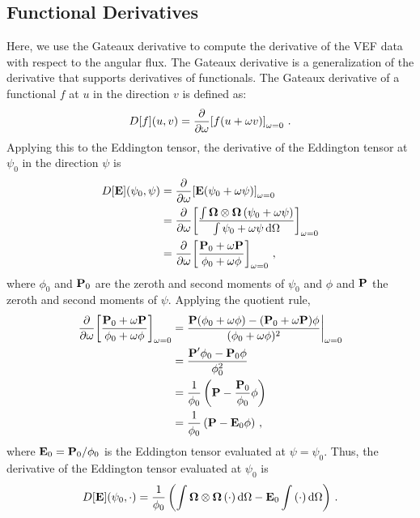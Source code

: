 \documentclass[../doc.tex]{subfiles}
\begin{document}
\subsection{Functional Derivatives}
Here, we use the Gateaux derivative to compute the derivative of the VEF data with respect to the angular flux. The Gateaux derivative is a generalization of the derivative that supports derivatives of functionals. The Gateaux derivative of a functional $f$ at $u$ in the direction $v$ is defined as: 
	\begin{equation}
		D[f](u,v) = \pderiv{}{\omega}\bracket{f(u + \omega v)}_{\omega = 0} \,. 
	\end{equation}
Applying this to the Eddington tensor, the derivative of the Eddington tensor at $\psi_0$ in the direction $\psi$ is 
	\begin{equation}
	\begin{aligned}
		D[\E](\psi_0,\psi) &= \pderiv{}{\omega} \bracket{\E(\psi_0 + \omega\psi)}_{\omega=0} \\
		&= \pderiv{}{\omega}\bracket{\frac{\int \Omegahat\otimes\Omegahat\paren{\psi_0 + \omega\psi}}{\int \psi_0 + \omega \psi \ud \Omega}}_{\omega=0} \\
		&= \pderiv{}{\omega}\bracket{\frac{\P_0 + \omega\P}{\phi_0 + \omega\phi}}_{\omega=0} \,,
	\end{aligned}
	\end{equation}
where $\phi_0$ and $\P_0$ are the zeroth and second moments of $\psi_0$ and $\phi$ and $\P$ the zeroth and second moments of $\psi$. Applying the quotient rule, 
	\begin{equation}
	\begin{aligned}
		\pderiv{}{\omega}\bracket{\frac{\P_0 + \omega\P}{\phi_0 + \omega\phi}}_{\omega=0} &= \frac{\P(\phi_0 + \omega \phi) - (\P_0 + \omega\P)\phi}{(\phi_0 + \omega\phi)^2} \biggr\rvert_{\omega=0} \\
		&= \frac{\P' \phi_0 - \P_0 \phi}{\phi_0^2} \\
		&= \frac{1}{\phi_0}\paren{\P - \frac{\P_0}{\phi_0} \phi} \\
		&= \frac{1}{\phi_0}\paren{\P - \E_0 \phi} \,, 
	\end{aligned}
	\end{equation}
where $\E_0 = \P_0/\phi_0$ is the Eddington tensor evaluated at $\psi = \psi_0$. 
Thus, the derivative of the Eddington tensor evaluated at $\psi_0$ is 
	\begin{equation}
		D[\E](\psi_0,\cdot) = \frac{1}{\phi_0} \paren{\int \Omegahat\otimes\Omegahat\paren{\cdot}\ud\Omega - \E_0\int \paren{\cdot}\ud \Omega} \,. 
	\end{equation}
\end{document}
